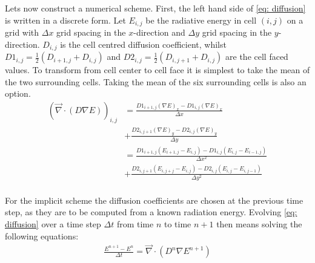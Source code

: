 Lets now construct a numerical scheme. First, the left hand side of \eqref{eq: diffusion} is written in a discrete form. Let $E_{i,j}$ be the radiative energy in cell $(i,j)$ on a grid with $\Delta x$ grid spacing in the $x$-direction and $\Delta y$ grid spacing in the $y$-direction. $D_{i,j}$ is the cell centred diffusion coefficient, whilst $D1_{i,j} = \frac{1}{2} (D_{i+1,j} + D_{i,j})$ and $D2_{i,j} = \frac{1}{2} (D_{i,j+1} + D_{i,j})$ are the cell faced values. To transform from cell center to cell face it is simplest to take the mean of the two surrounding cells. Taking the mean of the six surrounding cells is also an option. 
\begin{align}
\left( \vec{\nabla} \cdot \left(D \nabla E\right) \right)_{i,j} 
 &= \frac{D1_{i+1,j} (\nabla E)_{x} - D1_{i,j} (\nabla E)_{x}}{\Delta x} \\
 &+ \frac{D2_{i,j+1} (\nabla E)_{y} - D2_{i,j} (\nabla E)_{y}}{\Delta y} \\ 
 &= \frac{D1_{i+1,j} (E_{i+1,j} - E_{i,j}) - D1_{i,j} (E_{i,j} - E_{i-1,j})}{\Delta x^2} \\
 &+ \frac{D2_{i,j+1} (E_{i,j+j} - E_{i,j}) - D2_{i,j} (E_{i,j} - E_{i,j-1})}{\Delta y^2} \\ 
\end{align}

For the implicit scheme the diffusion coefficients are chosen at the previous time step, as they are to be computed from a known radiation energy. Evolving \eqref{eq: diffusion} over a time step $\Delta t$ from time $n$ to time $n+1$ then means solving the following equations:
\begin{align}
\frac{E^{n+1} - E^{n}}{\Delta t} = \vec{\nabla} \cdot \left(D^n \nabla E^{n+1}\right) \label{eq: Error_control}
\end{align}

